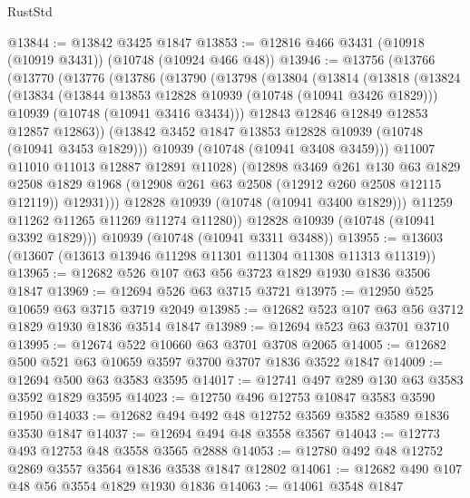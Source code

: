 \begin{lexlean}{RustStd}
\begin{coremodule}
@13844 := @13842 @3425 @1847
@13853 := @12816 @466 @3431 (@10918 (@10919 @3431)) (@10748 (@10924 @466 @48))
@13946 := @13756
    (@13766
      (@13770
        (@13776
          (@13786
            (@13790
              (@13798
                (@13804
                  (@13814
                    (@13818
                      (@13824
                        (@13834
                          (@13844 @13853 @12828 @10939 (@10748 (@10941 @3426 @1829)))
                          @10939
                          (@10748 (@10941 @3416 @3434)))
                        @12843
                        @12846
                        @12849
                        @12853
                        @12857
                        @12863))
                    (@13842 @3452 @1847 @13853 @12828 @10939 (@10748 (@10941 @3453 @1829)))
                    @10939
                    (@10748 (@10941 @3408 @3459)))
                  @11007
                  @11010
                  @11013
                  @12887
                  @12891
                  @11028)
                (@12898
                  @3469
                  @261
                  @130
                  @63
                  @1829
                  @2508
                  @1829
                  @1968
                  (@12908 @261 @63 @2508 (@12912 @260 @2508 @12115 @12119))
                  @12931)))
            @12828
            @10939
            (@10748 (@10941 @3400 @1829)))
          @11259
          @11262
          @11265
          @11269
          @11274
          @11280))
      @12828
      @10939
      (@10748 (@10941 @3392 @1829)))
    @10939
    (@10748 (@10941 @3311 @3488))
@13955 := @13603 (@13607 (@13613 @13946 @11298 @11301 @11304 @11308 @11313 @11319))
@13965 := @12682 @526 @107 @63 @56 @3723 @1829 @1930 @1836 @3506 @1847
@13969 := @12694 @526 @63 @3715 @3721
@13975 := @12950 @525 @10659 @63 @3715 @3719 @2049
@13985 := @12682 @523 @107 @63 @56 @3712 @1829 @1930 @1836 @3514 @1847
@13989 := @12694 @523 @63 @3701 @3710
@13995 := @12674 @522 @10660 @63 @3701 @3708 @2065
@14005 := @12682 @500 @521 @63 @10659 @3597 @3700 @3707 @1836 @3522 @1847
@14009 := @12694 @500 @63 @3583 @3595
@14017 := @12741 @497 @289 @130 @63 @3583 @3592 @1829 @3595
@14023 := @12750 @496 @12753 @10847 @3583 @3590 @1950
@14033 := @12682 @494 @492 @48 @12752 @3569 @3582 @3589 @1836 @3530 @1847
@14037 := @12694 @494 @48 @3558 @3567
@14043 := @12773 @493 @12753 @48 @3558 @3565 @2888
@14053 := @12780 @492 @48 @12752 @2869 @3557 @3564 @1836 @3538 @1847 @12802
@14061 := @12682 @490 @107 @48 @56 @3554 @1829 @1930 @1836
@14063 := @14061 @3548 @1847

\end{coremodule}
\end{lexlean}

